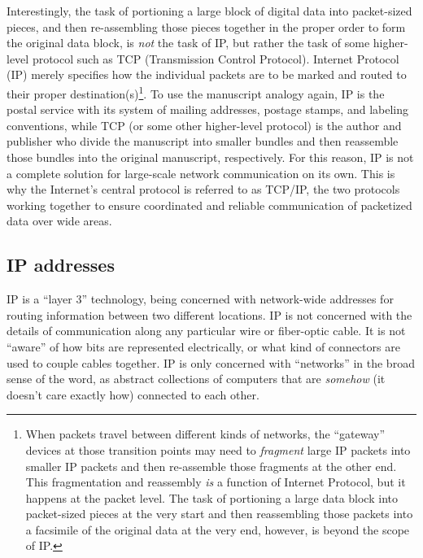 \vskip 10pt

Interestingly, the task of portioning a large block of digital data into packet-sized pieces, and then re-assembling those pieces together in the proper order to form the original data block, is \textit{not} the task of IP, but rather the task of some higher-level protocol such as TCP (Transmission Control Protocol).  Internet Protocol (IP) merely specifies how the individual packets are to be marked and routed to their proper destination(s)\footnote{When packets travel between different kinds of networks, the ``gateway'' devices at those transition points may need to \textit{fragment} large IP packets into smaller IP packets and then re-assemble those fragments at the other end.  This fragmentation and reassembly \textit{is} a function of Internet Protocol, but it happens at the packet level.  The task of portioning a large data block into packet-sized pieces at the very start and then reassembling those packets into a facsimile of the original data at the very end, however, is beyond the scope of IP.}.  To use the manuscript analogy again, IP is the postal service with its system of mailing addresses, postage stamps, and labeling conventions, while TCP (or some other higher-level protocol) is the author and publisher who divide the manuscript into smaller bundles and then reassemble those bundles into the original manuscript, respectively.  For this reason, IP is not a complete solution for large-scale network communication on its own.  This is why the Internet's central protocol is referred to as TCP/IP, the two protocols working together to ensure coordinated and reliable communication of packetized data over wide areas.      







\filbreak
\subsection{IP addresses}

IP is a ``layer 3'' technology, being concerned with network-wide addresses for routing information between two different locations.  IP is not concerned with the details of communication along any particular wire or fiber-optic cable.  It is not ``aware'' of how bits are represented electrically, or what kind of connectors are used to couple cables together.  IP is only concerned with ``networks'' in the broad sense of the word, as abstract collections of computers that are \textit{somehow} (it doesn't care exactly how) connected to each other.

